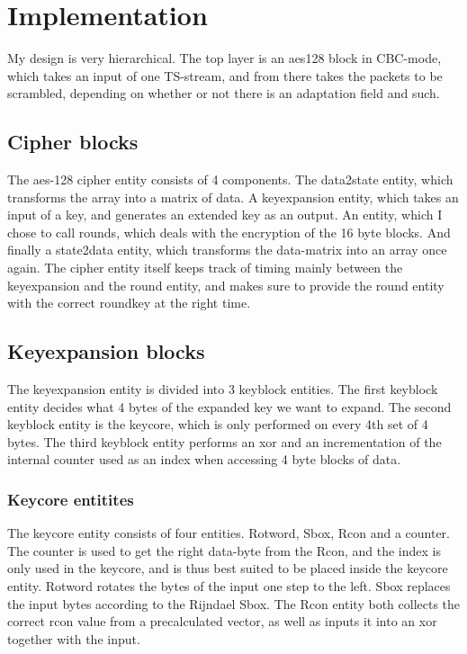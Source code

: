 \section{Implementation}
My design is very hierarchical. The top layer is an aes128 block in CBC-mode, 
which takes an input of one TS-stream, and from there takes the packets to be 
scrambled, depending on whether or not there is an adaptation field and such.

\subsection{Cipher blocks}
The aes-128 cipher entity consists of 4 components. The data2state entity, which 
transforms the array into a matrix of data. A keyexpansion entity, which takes 
an input of a key, and generates an extended key as an output. An entity, which I
chose to call rounds, which deals with the encryption of the 16 byte blocks. And 
finally a state2data entity, which transforms the data-matrix into an array once 
again. The cipher entity itself keeps track of timing mainly between the 
keyexpansion and the round entity, and makes sure to provide the round entity 
with the correct roundkey at the right time.

\subsection{Keyexpansion blocks}
The keyexpansion entity is divided into 3 keyblock entities. The first keyblock 
entity decides what 4 bytes of the expanded key we want to expand. The second 
keyblock entity is the keycore, which is only performed on every 4th set of 
4 bytes. The third keyblock entity performs an xor and an incrementation of the 
internal counter used as an index when accessing 4 byte blocks of data.

\subsubsection{Keycore entitites}
The keycore entity consists of four entities. Rotword, Sbox, Rcon and a counter. 
The counter is used to get the right data-byte from the Rcon, and the index is 
only used in the keycore, and is thus best suited to be placed inside the 
keycore entity. Rotword rotates the bytes of the input one step to the left. 
Sbox replaces the input bytes according to the Rijndael Sbox. The Rcon entity 
both collects the correct rcon value from a precalculated vector, as well as 
inputs it into an xor together with the input.

